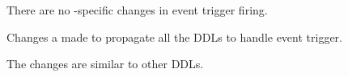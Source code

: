 There are no \XC-specific changes in event trigger firing.

Changes a made to propagate all the DDLs to handle event trigger.

The changes are similar to other DDLs.

